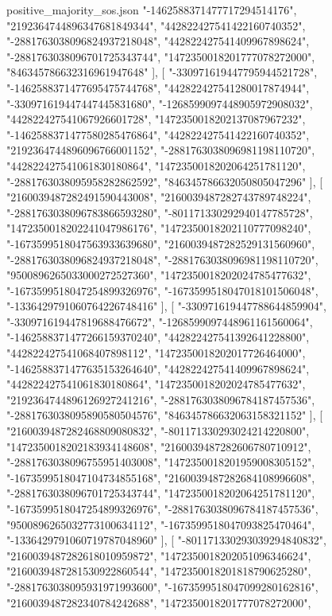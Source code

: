 \begin{filecontents*}[overwrite]{positive_majority_sos.json}
    "-1462588371477717294514176",
    "2192364744896347681849344",
    "442822427541422160740352",
    "-2881763038096824937218048",
    "442822427541409967898624",
    "-2881763038096701725343744",
    "1472350018201777078272000",
    "846345786632316961947648"
   ],
   [
    "-330971619447795944521728",
    "-1462588371477695475744768",
    "442822427541280017874944",
    "-330971619447447445831680",
    "-1268599097448905972908032",
    "442822427541067926601728",
    "1472350018202137087967232",
    "-1462588371477580285476864",
    "442822427541422160740352",
    "2192364744896096766001152",
    "-2881763038096981198110720",
    "442822427541061830180864",
    "1472350018202064251781120",
    "-2881763038095958282862592",
    "846345786632050805047296"
   ],
   [
    "2160039487282491590443008",
    "2160039487282743789748224",
    "-2881763038096783866593280",
    "-801171330292940147785728",
    "1472350018202241047986176",
    "1472350018202110777098240",
    "-1673599518047563933639680",
    "2160039487282529131560960",
    "-2881763038096824937218048",
    "-2881763038096981198110720",
    "9500896265033000272527360",
    "1472350018202024785477632",
    "-1673599518047254899326976",
    "-1673599518047018101506048",
    "-1336429791060764226748416"
   ],
   [
    "-330971619447788644859904",
    "-330971619447819688476672",
    "-1268599097448961161560064",
    "-1462588371477266159370240",
    "442822427541392641228800",
    "442822427541068407898112",
    "1472350018202017726464000",
    "-1462588371477635153264640",
    "442822427541409967898624",
    "442822427541061830180864",
    "1472350018202024785477632",
    "2192364744896126927241216",
    "-2881763038096784187457536",
    "-2881763038095890580504576",
    "846345786632063158321152"
   ],
   [
    "2160039487282468809080832",
    "-801171330293024214220800",
    "1472350018202183934148608",
    "2160039487282606780710912",
    "-2881763038096755951403008",
    "1472350018201959008305152",
    "-1673599518047104734855168",
    "2160039487282684108996608",
    "-2881763038096701725343744",
    "1472350018202064251781120",
    "-1673599518047254899326976",
    "-2881763038096784187457536",
    "9500896265032773100634112",
    "-1673599518047093825470464",
    "-1336429791060719787048960"
   ],
   [
    "-801171330293039294840832",
    "2160039487282618010959872",
    "1472350018202051096346624",
    "2160039487281530922860544",
    "1472350018201818790625280",
    "-2881763038095931971993600",
    "-1673599518047099280162816",
    "2160039487282340784242688",
    "1472350018201777078272000",

\end{filecontents*}
